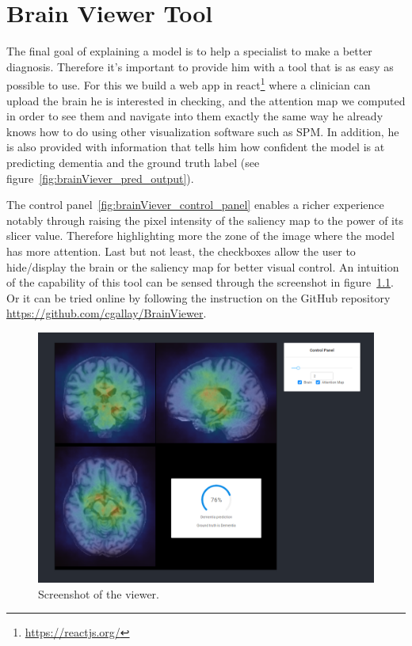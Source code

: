 \chapter{Brain Viewer Tool}
\label{chap:brainviewer}
The final goal of explaining a model is to help a specialist to make a better diagnosis. Therefore it's important to provide him with a tool that is as easy as possible to use. For this we build a web app in react\footnote{\href{https://reactjs.org/}{https://reactjs.org/}} where a clinician can upload the brain he is interested in checking, and the attention map we computed in order to see them and navigate into them exactly the same way he already knows how to do using other visualization software such as SPM\footnotemark{}. In addition, he is also provided with information that tells him how confident the model is at predicting dementia and the ground truth label (see figure~\ref{fig:brainViever_pred_output}).

The control panel~\ref{fig:brainViever_control_panel} enables a richer experience notably through raising the pixel intensity of the saliency map to the power of its slicer value. Therefore highlighting more the zone of the image where the model has more attention. Last but not least, the checkboxes allow the user to hide/display the brain or the saliency map for better visual control. An intuition of the capability of this tool can be sensed through the screenshot in figure~\ref{fig:brain_viewer}. Or it can be tried online by following the instruction on the GitHub repository \href{https://github.com/cgallay/BrainViewer}{https://github.com/cgallay/BrainViewer}.

\newpage

\begin{figure}
 \centering
 \includegraphics[width=.9\linewidth]{figures/BrainViewer/main.png}
 \captionsetup{width=.9\linewidth}
 \caption{Screenshot of the viewer.}
 \label{fig:brain_viewer}
\end{figure}

